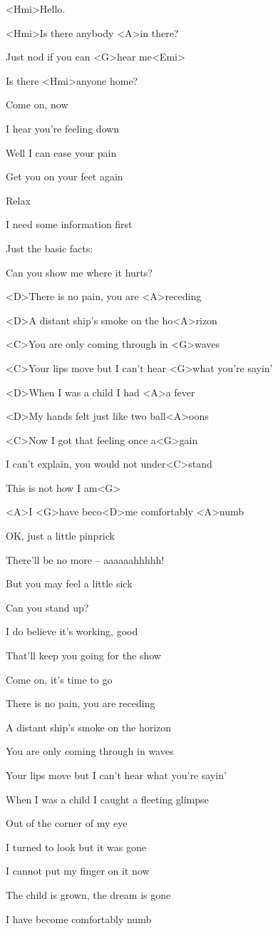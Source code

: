 
\zs
<Hmi>Hello.

<Hmi>Is there anybody <A>in there? 

Just nod if you can <G>hear me<Emi>

Is there <Hmi>anyone home?
\ks

\zs
Come on, now

I hear you’re feeling down

Well I can ease your pain

Get you on your feet again
\ks

\zs
Relax

I need some information first

Just the basic facts:

Can you show me where it hurts? 
\ks

\zr
<D>There is no pain, you are <A>receding

<D>A distant ship’s smoke on the ho<A>rizon

<C>You are only coming through in <G>waves

<C>Your lips move but I can’t hear <G>what you’re sayin’

<D>When I was a child I had <A>a fever

<D>My hands felt just like two ball<A>oons

<C>Now I got that feeling once a<G>gain

I can’t explain, you would not under<C>stand

This is not how I am<G>

<A>I <G>have beco<D>me comfortably <A>numb
\kr

\zs
OK,
just a little pinprick

There’ll be no more -- aaaaaahhhhh!

But you may feel a little sick
\ks

\zs
Can you stand up? 

I do believe it’s working, good

That’ll keep you going for the show

Come on, it’s time to go
\ks

\zr
There is no pain, you are receding

A distant ship’s smoke on the horizon

You are only coming through in waves

Your lips move but I can’t hear what you’re sayin’

When I was a child I caught a fleeting glimpse

Out of the corner of my eye

I turned to look but it was gone

I cannot put my finger on it now

The child is grown, the dream is gone

I have become comfortably numb
\kr
\kp

